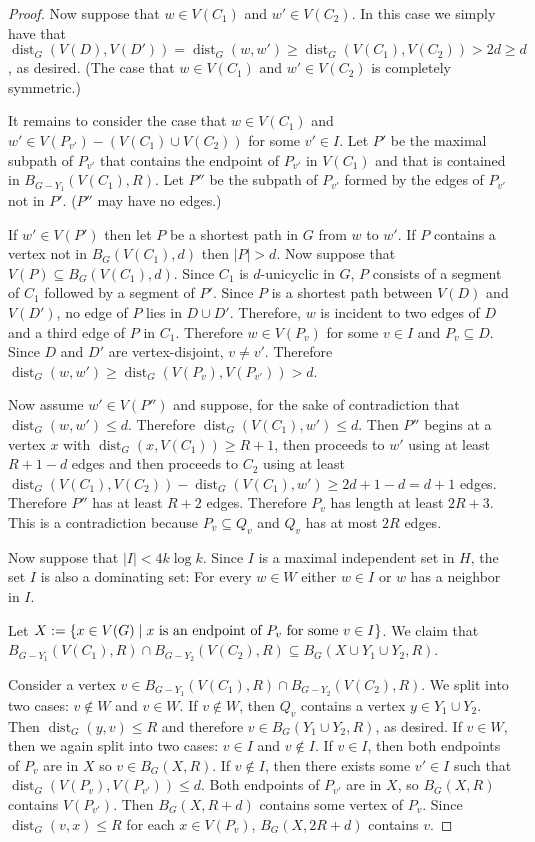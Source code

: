 \documentclass{patmorin}
\DeclareMathOperator{\dist}{dist}
\DeclarePairedDelimiter\set{\{}{\}}
\begin{document}
\begin{proof}
    Now suppose that $w\in V(C_1)$ and $w'\in V(C_2)$.
    In this case we simply have that
    $\dist_G(V(D),V(D'))=\dist_G(w,w')\geq \dist_G(V(C_1),V(C_2))>2d\geq d$, as desired.
    (The case that $w\in V(C_1)$ and $w'\in V(C_2)$ is completely symmetric.)

    It remains to consider the case that
    $w\in V(C_1)$ and $w'\in V(P_{v'})- (V(C_1)\cup V(C_2))$ for some $v'\in I$.  Let $P'$ be the maximal subpath of $P_{v'}$ that contains the endpoint of $P_{v'}$ in $V(C_1)$ and that is contained in $B_{G-Y_1}(V(C_1),R)$. Let $P''$ be the subpath of $P_{v'}$ formed by the edges of $P_{v'}$ not in $P'$.  ($P''$ may have no edges.)

    If $w'\in V(P')$ then let $P$ be a shortest path in $G$ from $w$ to $w'$.  If $P$ contains a vertex not in $B_G(V(C_1),d)$ then $|P|> d$.
    Now suppose that $V(P)\subseteq B_G(V(C_1),d)$.
    Since $C_1$ is $d$-unicyclic in $G$, $P$ consists of a segment of $C_1$ followed by a segment of $P'$.
    Since $P$ is a shortest path between $V(D)$ and $V(D')$, no edge of $P$ lies in $D\cup D'$.  Therefore, $w$ is incident to two edges of $D$ and a third edge of $P$ in $C_1$.  Therefore $w\in V(P_v)$ for some $v\in I$ and $P_v\subseteq D$.  Since $D$ and $D'$ are vertex-disjoint, $v\neq v'$.  Therefore $\dist_G(w,w')\ge\dist_G(V(P_v),V(P_{v'}))>d$.

    Now assume $w'\in V(P'')$ and suppose, for the sake of contradiction that $\dist_G(w,w')\le d$. Therefore $\dist_G(V(C_1),w')\le d$.  Then $P''$ begins at a vertex $x$ with $\dist_G(x,V(C_1))\ge R+1$, then proceeds to $w'$ using at least $R+1-d$ edges and then proceeds to $C_2$ using at least $\dist_G(V(C_1),V(C_2))-\dist_G(V(C_1),w')\ge 2d+1-d=d+1$ edges.  Therefore $P''$ has at least $R+2$ edges.  Therefore $P_v$ has length at least $2R+3$. This is a contradiction because $P_v\subseteq Q_v$ and $Q_v$ has at most $2R$ edges.

    Now suppose that $|I|<4k\log k$.
    Since $I$ is a maximal independent set in $H$, the set $I$ is also a dominating set:
    For every $w\in W$ either $w\in I$ or $w$ has a neighbor in $I$.

    Let $X:=\set{x \in V(G) \mid \textrm{$x$ is an endpoint of $P_v$ for some $v\in I$}}$.
    We claim that
    $B_{G-Y_1}(V(C_1),R)\cap B_{G-Y_2}(V(C_2),R)\subseteq B_G(X\cup Y_1\cup Y_2,R)$.

    Consider a vertex $v \in B_{G-Y_1}(V(C_1),R)\cap B_{G-Y_2}(V(C_2),R)$.
    We split into two cases: $v\not\in W$ and $v\in W$.
    If $v\not\in W$, then $Q_v$ contains a vertex $y \in Y_1\cup Y_2$.
    Then $\dist_G(y,v) \leq R$ and therefore
    $v\in B_G(Y_1\cup Y_2,R)$, as desired.
    If $v\in W$, then we again split into two cases: $v\in I$ and $v\notin I$.
    If $v\in I$, then both endpoints of $P_v$ are in $X$ so $v\in B_G(X,R)$.
    If $v\notin I$, then there exists some $v'\in I$ such that $\dist_G(V(P_v),V(P_{v'}))\le d$.
    Both endpoints of $P_{v'}$ are in $X$, so $B_G(X,R)$ contains $V(P_{v'})$.  Then $B_G(X,R+d)$ contains some vertex of $P_v$.  Since $\dist_G(v,x)\le R$ for each $x\in V(P_v)$, $B_G(X,2R+d)$ contains $v$.
\end{proof}
\end{document}
